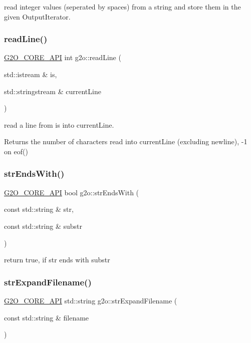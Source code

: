 read integer values (seperated by spaces) from a string and store them in the given Output\+Iterator. \mbox{\label{group__utils_ga570513203e2bbf23d692460c0aef07e8}} 
\subsubsection{\texorpdfstring{read\+Line()}{readLine()}}
{\footnotesize\ttfamily \mbox{\hyperlink{g2o__core__api_8h_a7a8d7648d6f1e26632566f335751d064}{G2\+O\+\_\+\+C\+O\+R\+E\+\_\+\+A\+PI}} int g2o\+::read\+Line (\begin{DoxyParamCaption}\item[{std\+::istream \&}]{is,  }\item[{std\+::stringstream \&}]{current\+Line }\end{DoxyParamCaption})}

read a line from is into current\+Line. \begin{DoxyReturn}{Returns}
the number of characters read into current\+Line (excluding newline), -\/1 on eof() 
\end{DoxyReturn}
\mbox{\label{group__utils_ga7a0e6ad89c4c86b2b60ddf392a57c963}} 
\subsubsection{\texorpdfstring{str\+Ends\+With()}{strEndsWith()}}
{\footnotesize\ttfamily \mbox{\hyperlink{g2o__core__api_8h_a7a8d7648d6f1e26632566f335751d064}{G2\+O\+\_\+\+C\+O\+R\+E\+\_\+\+A\+PI}} bool g2o\+::str\+Ends\+With (\begin{DoxyParamCaption}\item[{const std\+::string \&}]{str,  }\item[{const std\+::string \&}]{substr }\end{DoxyParamCaption})}

return true, if str ends with substr \mbox{\label{group__utils_ga45c2648d8a8a5f5bed13741bc8a501d1}} 
\subsubsection{\texorpdfstring{str\+Expand\+Filename()}{strExpandFilename()}}
{\footnotesize\ttfamily \mbox{\hyperlink{g2o__core__api_8h_a7a8d7648d6f1e26632566f335751d064}{G2\+O\+\_\+\+C\+O\+R\+E\+\_\+\+A\+PI}} std\+::string g2o\+::str\+Expand\+Filename (\begin{DoxyParamCaption}\item[{const std\+::string \&}]{filename }\end{DoxyParamCaption})}

